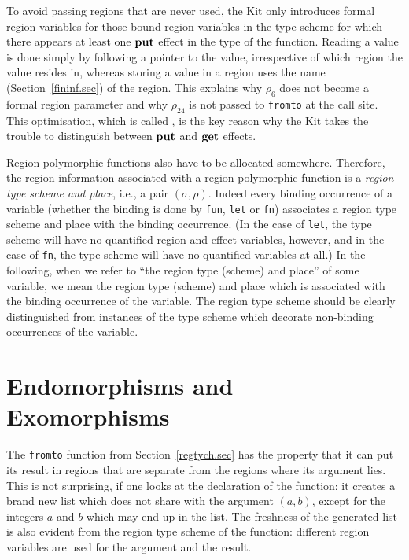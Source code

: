 \documentclass[12pt]{book}
\begin{document}
To avoid passing regions that are never used, the Kit only introduces 
formal region variables for those bound region variables in the type scheme
for which there appears at least one $\mathop{\bf put}\nolimits$ effect in the type of the function.
Reading a value is done simply by following a pointer to the value, irrespective
of which region the value resides in, whereas storing a value in a region uses the
name (Section~\ref{fininf.sec}) of the region.
This explains why  $\rho_6$ does not become a formal region parameter and why
$\rho_{24}$ is not passed to {\tt fromto} at the call site. This optimisation,
which is called , is
the key reason why the Kit takes the trouble to distinguish
between $\mathop{\bf put}\nolimits$ and $\mathop{\bf get}\nolimits$ effects\label{bother-to-distinguish-get-n-put}.

Region-polymorphic functions also have to be allocated somewhere.
Therefore, the region information associated with a region-polymorphic
function is a {\em region type scheme and place}, i.e., a pair
$(\sigma,\rho)$.  Indeed every binding occurrence of a variable
(whether the binding is done by {\tt fun}, {\tt let} or {\tt fn})
associates a region type scheme and place with the binding occurrence.
(In the case of {\tt let}, the type scheme will have no quantified
region and effect variables, however, and in the case of {\tt fn}, the
type scheme will have no quantified variables at all.) In the
following, when we refer to ``the region type (scheme) and place'' of
some variable, we mean the region type (scheme) and place which is
associated with the binding occurrence of the variable. The region
type scheme should be clearly distinguished from instances of the type
scheme which decorate non-binding occurrences of the variable.

\section{Endomorphisms and Exomorphisms}
The {\tt fromto} function from Section~\ref{regtych.sec} has the property that
it can put its result in regions that are separate from the regions where its
argument lies. This is not surprising, if one looks at the declaration of the
function: it creates a brand new list which does not share with the argument
$(a,b)$, except for the integers $a$ and $b$ which may end up in the list.
The freshness of the generated list is also evident from the region type scheme
of the function: different region variables are used for the argument and the result.
\end{document}
